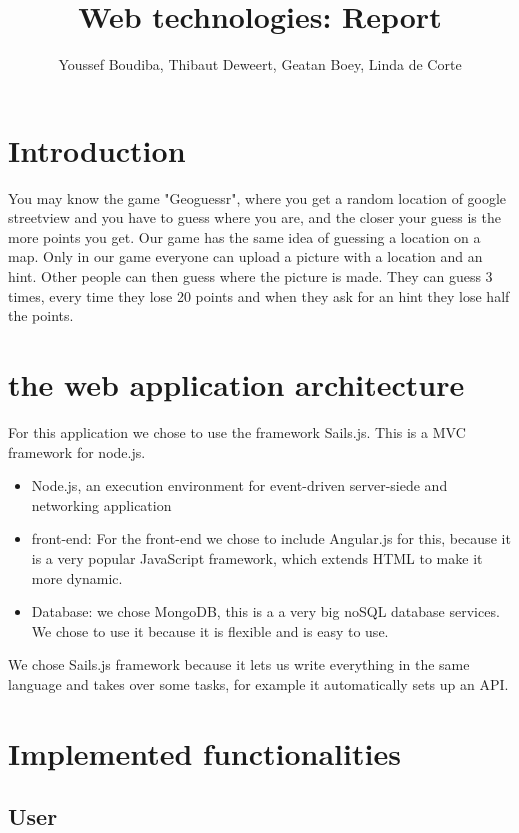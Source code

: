 \documentclass[11pt, oneside]{article}   	%
\title{Web technologies: Report}
\author{Youssef Boudiba, Thibaut Deweert, Geatan Boey, Linda de Corte }
\date{}							%
\begin{document}
\maketitle
\clearpage

\tableofcontents
\clearpage


\section{Introduction}
You may know the game "Geoguessr", where you get a random location of google streetview and you have to guess where you are, and the closer your guess is the more points you get. 
Our game has the same idea of guessing a location on a map. Only in our game everyone can upload a picture with a location and an hint. Other people can then guess where the picture is made. They can guess 3 times, every time they lose 20 points and when they ask for an hint they lose half the points.

\section{ the web application architecture}
For this application we chose to use the framework Sails.js. This is a  MVC framework for node.js. 

\begin{itemize}
\item Node.js, an execution environment for event-driven server-siede and networking application
\item front-end: For the front-end we chose to include Angular.js for this, because it is a very popular JavaScript framework, which extends HTML to make it more dynamic.
\item Database:  we chose MongoDB, this is a a very big noSQL database services. We chose to use it because it is flexible and is easy to use.
\end{itemize}

We chose Sails.js framework because it lets us write everything in the same language and takes over some tasks, for example it automatically sets up an API.


\section{Implemented functionalities}
\subsection{User}
\end{document}
